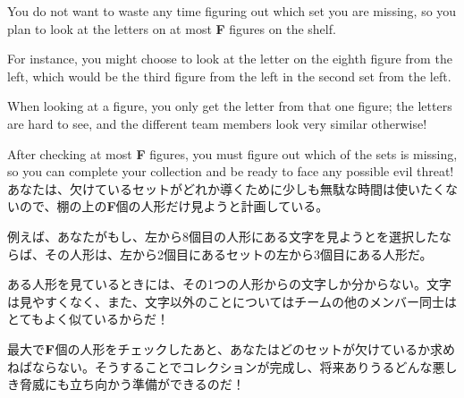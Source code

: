 \documentclass[uplatex,dvipdfmx]{jsarticle} \usepackage{amsmath,amssymb,bm}
\begin{document}
\vspace{\baselineskip}
\begin{paracol}{2}
You do not want to waste any time figuring out which set you are missing, so you plan to look at the letters on at most {\bf F} figures on the shelf.

For instance, you might choose to look at the letter on the eighth figure from the left, which would be the third figure from the left in the second set from the left.

When looking at a figure, you only get the letter from that one figure; the letters are hard to see, and the different team members look very similar otherwise!

After checking at most {\bf F} figures, you must figure out which of the sets is missing, so you can complete your collection and be ready to face any possible evil threat!
\switchcolumn
あなたは、欠けているセットがどれか導くために少しも無駄な時間は使いたくないので、棚の上の{\bf F}個の人形だけ見ようと計画している。

例えば、あなたがもし、左から8個目の人形にある文字を見ようとを選択したならば、その人形は、左から2個目にあるセットの左から3個目にある人形だ。

ある人形を見ているときには、その1つの人形からの文字しか分からない。文字は見やすくなく、また、文字以外のことについてはチームの他のメンバー同士はとてもよく似ているからだ！

最大で${\bf F}$個の人形をチェックしたあと、あなたはどのセットが欠けているか求めねばならない。そうすることでコレクションが完成し、将来ありうるどんな悪しき脅威にも立ち向かう準備ができるのだ！
\end{paracol}
\end{document}

